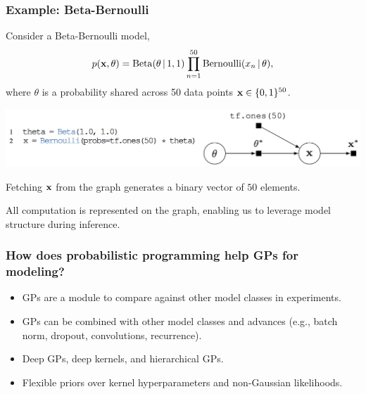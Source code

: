 \documentclass[10pt,
               xcolor={usenames,dvipsnames},
               hyperref={colorlinks,linktoc=all,citecolor=Plum,linkcolor=MidnightBlue,urlcolor=MidnightBlue},noamssymb]{beamer}
\begin{document}
\begin{frame}
\frametitle{Example: Beta-Bernoulli}
Consider a Beta-Bernoulli model,
\begin{align*}
p(\boldsymbol{\mathbf{x}}, \theta) =
\operatorname{Beta}(\theta\,|\, 1, 1)
\prod_{n=1}^{50} \operatorname{Bernoulli}(x_n\,|\, \theta),
\end{align*}
where $\theta$
is a probability shared across 50 data points $\boldsymbol{\mathbf{x}}\in\{0,1\}^{50}$.
\begin{center}
\vspace{-2ex}
\includegraphics[height=0.175\textwidth]{img/beta-bernoulli.png}
\end{center}
Fetching $\boldsymbol{\mathbf{x}}$ from the graph generates a binary vector of $50$ elements.

All computation is represented on the graph, enabling us to leverage model structure during inference.
\end{frame}

\begin{frame}
\frametitle{How does probabilistic programming help GPs for modeling?}
\begin{itemize}
\item
  GPs are a module to compare against other model classes in
  experiments.
\item
  GPs can be combined with other model classes and advances (e.g.,
  batch norm, dropout, convolutions, recurrence).
\item
  Deep GPs, deep kernels, and hierarchical GPs.
\item
  Flexible priors over kernel hyperparameters
  and non-Gaussian likelihoods.
\end{itemize}
\end{frame}
\end{document}

